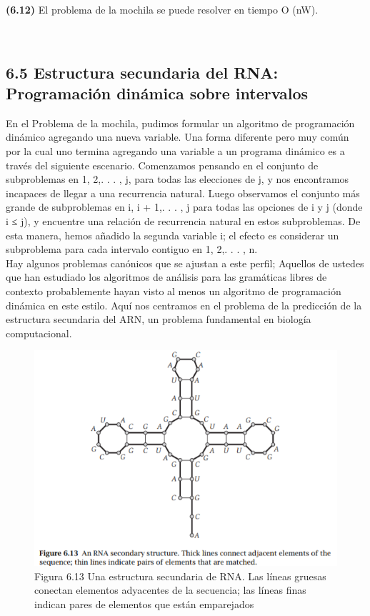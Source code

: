 \documentclass[a4paper]{article}
\begin{document}
\colorbox{mygray}{\parbox{15cm}{
\textbf{(6.12)} El problema de la mochila se puede resolver en tiempo O (nW).}}\\

\subsection{6.5 Estructura secundaria del RNA: Programación dinámica sobre intervalos}

En el Problema de la mochila, pudimos formular un algoritmo de programación dinámico agregando una nueva variable. Una forma diferente pero muy común por la cual uno termina agregando una variable a un programa dinámico es a través del siguiente escenario. Comenzamos pensando en el conjunto de subproblemas en {1, 2,. . . , j}, para todas las elecciones de j, y nos encontramos incapaces de llegar a una recurrencia natural. Luego observamos el conjunto más grande de subproblemas en {i, i + 1,. . . , j} para todas las opciones de i y j (donde i ≤ j), y encuentre una relación de recurrencia natural en estos subproblemas. De esta manera, hemos añadido la segunda variable i; el efecto es considerar un subproblema para cada intervalo contiguo en {1, 2,. . . , n}.\\

Hay algunos problemas canónicos que se ajustan a este perfil; Aquellos de ustedes que han estudiado los algoritmos de análisis para las gramáticas libres de contexto probablemente hayan visto al menos un algoritmo de programación dinámica en este estilo. Aquí nos centramos en el problema de la predicción de la estructura secundaria del ARN, un problema fundamental en biología computacional.\\

\begin{figure}[h]
\centering
\includegraphics[scale=1]{Imagenes-Seccion6/fig6_13.PNG}
\caption{Figura 6.13 Una estructura secundaria de RNA. Las líneas gruesas conectan elementos adyacentes de la secuencia; las líneas finas indican pares de elementos que están emparejados}
\end{figure}\\
\end{document}
